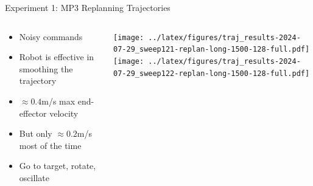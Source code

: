 \documentclass[16:9,en,navbarinfooter]{sdqbeamer}
\begin{document}
\begin{frame}{Experiment 1: MP3 Replanning Trajectories}

	\begin{columns}[t]
		\begin{column}{0.3\textwidth}
			\vspace{1cm}
			\begin{itemize}
				\item Noisy commands
				\item Robot is effective in smoothing the trajectory
				\item $\approx0.4$m/s max end-effector velocity
				\item But only $\approx0.2$m/s most of the time
				\item Go to target, rotate, oscillate
			\end{itemize}
		\end{column}
		\begin{column}{0.7\textwidth}
			\vspace{1cm}
			\texttt{[image: ../latex/figures/traj\_results-2024-07-29\_sweep121-replan-long-1500-128-full.pdf]} \\
			\texttt{[image: ../latex/figures/traj\_results-2024-07-29\_sweep122-replan-long-1500-128-full.pdf]}
		\end{column}
	\end{columns}
\end{frame}
\end{document}

